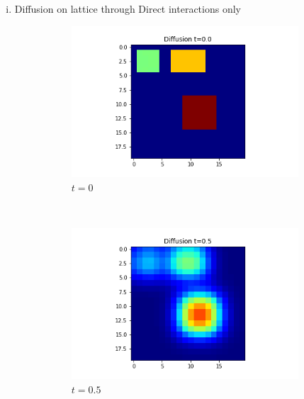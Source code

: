 \documentclass[10pt,a4paper]{article}
\begin{document}
    \begin{enumerate}[i)]
    	\item Diffusion on lattice through Direct interactions only
    	\begin{figure}[!h]
    		\centering
    		\begin{subfigure}[b]{0.25\textwidth}
    			\includegraphics[width=\textwidth]{images/grid-t0-x0.png}
    			\caption{$t=0$}
    			\label{gridt0x0}
    		\end{subfigure}~
    		\begin{subfigure}[b]{0.25\textwidth}
    			\includegraphics[width= \textwidth]{images/grid-t05-x0.png}
    			\caption{$t=0.5$}
    			\label{gridt05x0}
    		\end{subfigure}~
    		\begin{subfigure}[b]{0.25\textwidth}

\end{subfigure}
\end{figure}
\end{enumerate}
\end{document}
